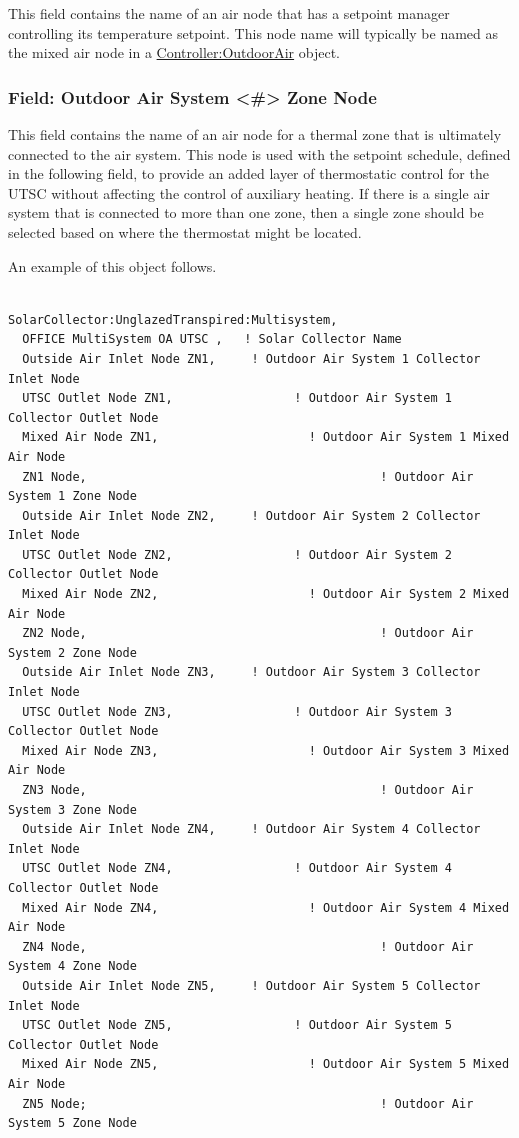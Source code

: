 This field contains the name of an air node that has a setpoint manager controlling its temperature setpoint. This node name will typically be named as the mixed air node in a \hyperref[controlleroutdoorair]{Controller:OutdoorAir} object.

\subsubsection{Field: Outdoor Air System \textless{}\#\textgreater{} Zone Node}\label{field-outdoor-air-system-zone-node}

This field contains the name of an air node for a thermal zone that is ultimately connected to the air system. This node is used with the setpoint schedule, defined in the following field, to provide an added layer of thermostatic control for the UTSC without affecting the control of auxiliary heating. If there is a single air system that is connected to more than one zone, then a single zone should be selected based on where the thermostat might be located.

An example of this object follows.

\begin{lstlisting}

SolarCollector:UnglazedTranspired:Multisystem,
  OFFICE MultiSystem OA UTSC ,   ! Solar Collector Name
  Outside Air Inlet Node ZN1,     ! Outdoor Air System 1 Collector Inlet Node
  UTSC Outlet Node ZN1,                 ! Outdoor Air System 1 Collector Outlet Node
  Mixed Air Node ZN1,                     ! Outdoor Air System 1 Mixed Air Node
  ZN1 Node,                                         ! Outdoor Air System 1 Zone Node
  Outside Air Inlet Node ZN2,     ! Outdoor Air System 2 Collector Inlet Node
  UTSC Outlet Node ZN2,                 ! Outdoor Air System 2 Collector Outlet Node
  Mixed Air Node ZN2,                     ! Outdoor Air System 2 Mixed Air Node
  ZN2 Node,                                         ! Outdoor Air System 2 Zone Node
  Outside Air Inlet Node ZN3,     ! Outdoor Air System 3 Collector Inlet Node
  UTSC Outlet Node ZN3,                 ! Outdoor Air System 3 Collector Outlet Node
  Mixed Air Node ZN3,                     ! Outdoor Air System 3 Mixed Air Node
  ZN3 Node,                                         ! Outdoor Air System 3 Zone Node
  Outside Air Inlet Node ZN4,     ! Outdoor Air System 4 Collector Inlet Node
  UTSC Outlet Node ZN4,                 ! Outdoor Air System 4 Collector Outlet Node
  Mixed Air Node ZN4,                     ! Outdoor Air System 4 Mixed Air Node
  ZN4 Node,                                         ! Outdoor Air System 4 Zone Node
  Outside Air Inlet Node ZN5,     ! Outdoor Air System 5 Collector Inlet Node
  UTSC Outlet Node ZN5,                 ! Outdoor Air System 5 Collector Outlet Node
  Mixed Air Node ZN5,                     ! Outdoor Air System 5 Mixed Air Node
  ZN5 Node;                                         ! Outdoor Air System 5 Zone Node
\end{lstlisting}